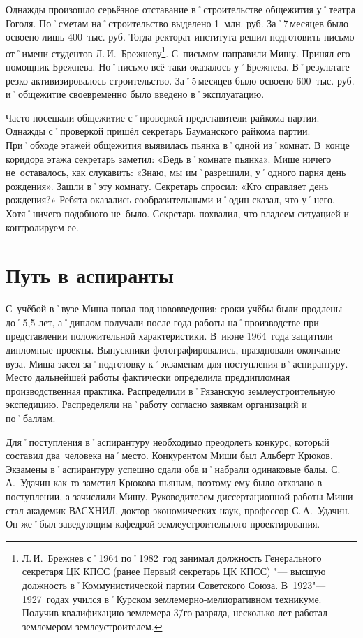 Однажды произошло серьёзное отставание в˚строительстве общежития у˚театра Гоголя. По˚сметам на˚строительство выделено 1~млн. руб. За˚7\,месяцев было освоено лишь 400~тыс. руб. Тогда ректорат института решил подготовить письмо от˚имени студентов Л.\,И.~Брежневу\footnote{Л.\,И.~Брежнев с˚1964 по˚1982~год занимал должность Генерального секретаря ЦК КПСС (ранее Первый секретарь ЦК КПСС) "--- высшую должность в˚Коммунистической партии Советского Союза. В~1923"---1927~годах учился в˚Курском землемерно-мелиоративном техникуме. Получив квалификацию землемера 3\=/го разряда, несколько лет работал землемером-землеустроителем.}. С~письмом направили Мишу. Принял его помощник Брежнева. Но˚письмо всё-таки оказалось у˚Брежнева. В˚результате резко активизировалось строительство. За˚5\,месяцев было освоено 600~тыс. руб. и˚общежитие своевременно было введено в˚эксплуатацию.

Часто посещали общежитие с˚проверкой представители райкома партии. Однажды с˚проверкой пришёл секретарь Бауманского райкома партии. При˚обходе этажей общежития выявилась пьянка в˚одной из˚комнат. В~конце коридора этажа секретарь заметил: «Ведь в˚комнате пьянка». Мише ничего не~оставалось, как слукавить: «Знаю, мы им˚разрешили, у˚одного парня день рождения». Зашли в˚эту комнату. Секретарь спросил: «Кто справляет день рождения?» Ребята оказались сообразительными и˚один сказал, что у˚него. Хотя˚ничего подобного не~было. Секретарь похвалил, что владеем ситуацией и контролируем ее.



\section*{Путь в аспиранты}
\label{sec:PathGraduateStudents}
С~учёбой в˚вузе Миша попал под нововведения: сроки учёбы были продлены до˚5,5 лет, а˚диплом получали после года работы на˚производстве при представлении положительной характеристики. В~июне 1964~года защитили дипломные проекты. Выпускники фотографировались, праздновали окончание вуза. Миша засел за˚подготовку к˚экзаменам для поступления в˚аспирантуру. Место дальнейшей работы фактически определила преддипломная производственная практика. Распределили в˚Рязанскую землеустроительную экспедицию. Распределяли на˚работу согласно заявкам организаций и по˚баллам.

Для˚поступления в˚аспирантуру необходимо преодолеть конкурс, который составил два~человека на˚место. Конкурентом Миши был Альберт Крюков. Экзамены в˚аспирантуру успешно сдали оба и˚набрали одинаковые балы. С.\,А.~Удачин как-то заметил Крюкова пьяным, поэтому ему было отказано в поступлении, а зачислили Мишу. Руководителем диссертационной работы Миши стал академик ВАСХНИЛ, доктор экономических наук, профессор С.\,А.~Удачин. Он же˚был заведующим кафедрой землеустроительного проектирования.

